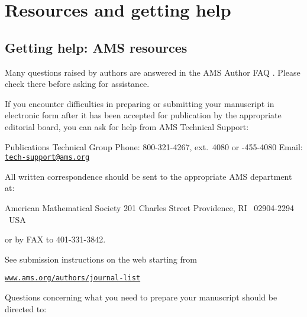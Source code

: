 
\chapter{Resources and getting help}\label{ch:resandhelp}

\enlargethispage{.5pc}

\section{Getting help: AMS resources}\label{sec:amsresources}
\label{ch:amsresources}

Many questions raised by authors are answered in the AMS Author FAQ
\cite{FAQ}.  Please check there before asking for assistance.

\hypertarget{adr-tech-support}{}%
If you encounter difficulties in preparing or submitting your
manuscript in electronic form after it has been accepted for
publication by the appropriate editorial board, you can ask for help
from AMS Technical Support:

\medskip
\begingroup
\obeylines
Publications Technical Group
Phone: 800-321-4267, ext.\ 4080 \quad or -455-4080
Email: \href{mailto:tech-support@ams.org}{\texttt{tech-support@ams.org}}
\endgroup
\medskip


All written correspondence should be sent to the appropriate AMS
department at:

\medskip
\begingroup
\obeylines
American Mathematical Society
201 Charles Street
Providence, RI \ 02904-2294 \ USA
\endgroup
\medskip

\noindent or by FAX to 401-331-3842.


\ifmonograph
\else \ifproceedings
\else
\medskip
See submission instructions on the web starting from

\begingroup
\obeylines
\href{http://www.ams.org/authors/journal-list}{\texttt{www.ams.org/authors/journal-list}}
\endgroup
\fi\fi

\ifjournal
\else \ifmemoirs
\else
\medskip
\hypertarget{adr-acquisitions}{}Questions concerning what you need
to prepare your manuscript should be directed to:

